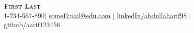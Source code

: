 \documentclass[]{resume-openfont}
\begin{document}
%
%
\newcommand{\yourName}{First Last}
\newcommand{\yourWebsite}{https://abdullaharif.tech}
\newcommand{\yourEmail}{someEmail@edu.com}
\newcommand{\yourPhone}{1-234-567-890}
\newcommand{\githubUserName}{aarif123456}
\newcommand{\linkedInUserName}{abdullaharif98}


\begin{center}
    \textbf{\Huge \scshape \yourName} \\ \vspace{1pt}
    \small \yourPhone $|$ \href{mailto:\yourEmail}{\underline{\yourEmail}} $|$ 
    \href{https://linkedin.com/in/\linkedInUserName}{\underline{linkedIn/\linkedInUserName}} $|$
    \href{https://github.com/\githubUserName}{\underline{github/\githubUserName}}
\end{center}

%
%
\end{document}
